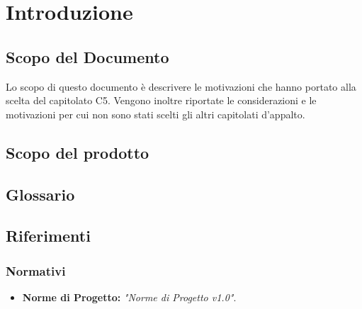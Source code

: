 \documentclass[a4paper, titlepage]{article}
\begin{document}
\pagestyle{fancy}	

\maketitle

\begin{diario}
\end{diario}

\newpage

\tableofcontents\label{lastromanpage}

\newpage
\clearpage
{}
\hypersetup{linkcolor=blue}

\section{Introduzione}
\subsection{Scopo del Documento}
Lo scopo di questo documento è descrivere le motivazioni che hanno portato
alla scelta del capitolato C5. Vengono inoltre riportate le considerazioni
e le motivazioni per cui non sono stati scelti gli altri capitolati d'appalto.

\subsection{Scopo del prodotto}
\SCOPO

\subsection{Glossario}
\GLOSSARIO

\subsection{Riferimenti}

\subsubsection{Normativi}
\begin{itemize}
	\item \textbf{Norme di Progetto: }\textit{"Norme di Progetto v1.0"}.
\end{itemize}
\end{document}
